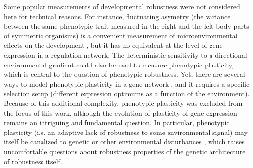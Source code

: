 \documentclass[10pt,a4paper]{article}
\begin{document}
Some popular measurements of developmental robustness were not considered here for technical reasons. For instance, fluctuating asymetry (the variance between the same phenotypic trait measured in the right and the left body parts of symmetric organisms) is a convenient measurement of microenvironmental effects on the development \citep{DD01,LK05}, but it has no equivalent at the level of gene expression in a regulation network. The deterministic sensitivity to a directional environmental gradient could also be used to measure phenotypic plasticity, which is central to the question of phenotypic robustness. Yet, there are several ways to model phenotypic plasticity in a gene network \citep{Mas04,ORL18}, and it requires a specific selection setup (different expression optimums as a function of the environment). Because of this additional complexity, phenotypic plasticity was excluded from the focus of this work, although the evolution of plasticity of gene expression remains an intriguing and fundamental question. In particular, phenotypic plasticity (i.e. an adaptive lack of robustness to some environmental signal) may itself be canalized to genetic or other environmental disturbances \citep{SK94}, which raises uncomfortable questions about robustness properties of the genetic architecture of robustness itself.  



\printbibliography




\clearpage
\end{document}
